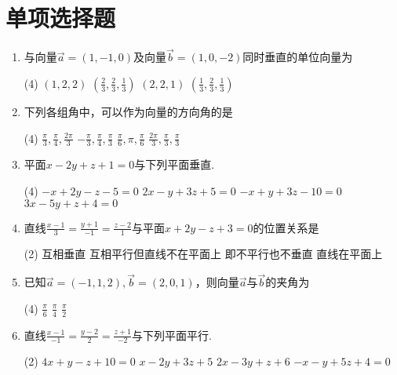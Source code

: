 \section{单项选择题}
\begin{enumerate}
	\item 与向量$\vec{a}=(1,-1,0)$及向量$\vec{b}=(1,0,-2)$同时垂直的单位向量为\emptychoice
		\begin{choice}(4)
			\choice $(1,2,2)$
			\choice $(\frac{2}{3},\frac{2}{3},\frac{1}{3})$
			\choice $(2,2,1)$
			\choice $(\frac{1}{3},\frac{2}{3},\frac{1}{3})$
		\end{choice}
	\item 下列各组角中，可以作为向量的方向角的是\emptychoice
		\begin{choice}(4)
			\choice $\frac{\pi}{3},\frac{\pi}{4},\frac{2\pi}{3} $
			\choice $-\frac{\pi}{3},\frac{\pi}{4},\frac{\pi}{3} $
			\choice $\frac{\pi}{6},\pi,\frac{\pi}{6} $
			\choice $\frac{2\pi}{3},\frac{\pi}{3},\frac{\pi}{3} $
		\end{choice}
	\item 平面$x-2y+z+1=0$与下列平面\emptychoice 垂直.
		\begin{choice}(4)
			\choice $-x+2y-z-5=0$
			\choice $2x-y+3z+5=0$
			\choice $-x+y+3z-10=0$
			\choice $3x-5y+z+4=0$
		\end{choice}
	\item 直线$ \frac{x-1}{3}=\frac{y+1}{-1}=\frac{z-2}{1} $与平面$ x+2y-z+3=0 $的位置关系是\emptychoice
		\begin{choice}(2)
			\choice 互相垂直
			\choice 互相平行但直线不在平面上
			\choice 即不平行也不垂直
			\choice 直线在平面上
		\end{choice}
	\item 已知$ \vec{a}=(-1,1,2), \vec{b}=(2,0,1) $，则向量$ \vec{a} $与$ \vec{b} $的夹角为\emptychoice
		\begin{choice}(4)
			\choice 0
			\choice $ \frac{\pi}{6} $
			\choice $ \frac{\pi}{4} $
			\choice $ \frac{\pi}{2} $
		\end{choice}
	\item 直线$ \frac{x-1}{-1}=\frac{y-2}{2}=\frac{z+1}{-2} $与下列平面\emptychoice 平行.
		\begin{choice}(2)
			\choice $ 4x+y-z+10=0 $
			\choice $ x-2y+3z+5 $
			\choice $ 2x-3y+z+6 $
			\choice $ -x-y+5z+4=0 $
		\end{choice}
\end{enumerate}
